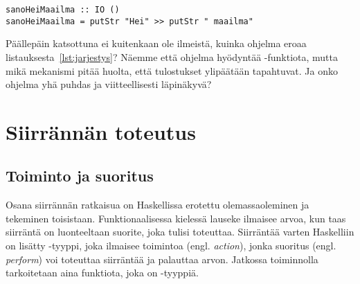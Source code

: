 \documentclass[finnish]{tktltiki2}
\begin{document}
\begin{lstlisting}[float,label={lst:then},caption={Toimiva tulostus}]
sanoHeiMaailma :: IO ()
sanoHeiMaailma = putStr "Hei" >> putStr " maailma"
\end{lstlisting}

Päällepäin katsottuna ei kuitenkaan ole ilmeistä, kuinka ohjelma eroaa
listauksesta~\ref{lst:jarjestys}? Näemme että ohjelma hyödyntää -funktiota, mutta mikä
mekanismi pitää huolta, että tulostukset ylipäätään tapahtuvat. Ja onko ohjelma yhä puhdas ja
viitteellisesti läpinäkyvä?






\section{Siirrännän toteutus}



\subsection{Toiminto ja suoritus}

Osana siirrännän ratkaisua on Haskellissa erotettu olemassaoleminen ja tekeminen toisistaan.
Funktionaalisessa kielessä lauseke ilmaisee arvoa, kun taas siirräntä on luonteeltaan suorite, joka
tulisi toteuttaa. Siirräntää varten Haskelliin on lisätty -tyyppi, joka ilmaisee toimintoa
(engl. \emph{action}), jonka suoritus (engl. \emph{perform}) voi toteuttaa siirräntää ja palauttaa
arvon. Jatkossa toiminnolla tarkoitetaan aina funktiota, joka on -tyyppiä.
\end{document}
